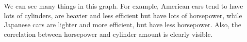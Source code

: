 \documentclass{article}
\begin{document}
We can see many things in this graph. For example, American cars tend to have
lots of cylinders, are heavier and less efficient but have lots of horsepower,
while Japanese cars are lighter and more efficient, but have less horsepower.
Also, the correlation between horsepower and cylinder amount is clearly
visible.
\end{document}
